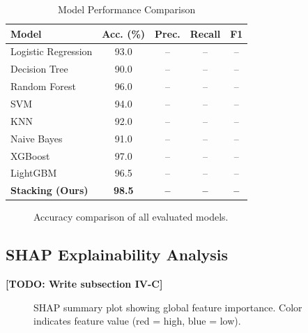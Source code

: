 \documentclass[conference]{IEEEtran}
\begin{document}
\begin{table}[htbp]
\caption{Model Performance Comparison}
\label{tab:model_comparison}
\centering
\renewcommand{\arraystretch}{1.2}
\begin{tabular}{|l|c|c|c|c|}
\hline
\textbf{Model} & \textbf{Acc. (\%)} & \textbf{Prec.} & \textbf{Recall} & \textbf{F1} \\
\hline
Logistic Regression  & 93.0 & -- & -- & -- \\
Decision Tree        & 90.0 & -- & -- & -- \\
Random Forest        & 96.0 & -- & -- & -- \\
SVM                  & 94.0 & -- & -- & -- \\
KNN                  & 92.0 & -- & -- & -- \\
Naive Bayes          & 91.0 & -- & -- & -- \\
XGBoost              & 97.0 & -- & -- & -- \\
LightGBM             & 96.5 & -- & -- & -- \\
\textbf{Stacking (Ours)} & \textbf{98.5} & \textbf{--} & \textbf{--} & \textbf{--} \\
\hline
\end{tabular}
\end{table}

\begin{figure}[htbp]
    \centering
    \caption{Accuracy comparison of all evaluated models.}
    \label{fig:model_comparison}
\end{figure}

\subsection{SHAP Explainability Analysis}
\textbf{[TODO: Write subsection IV-C]}

\begin{figure}[htbp]
    \centering
    \caption{SHAP summary plot showing global feature importance. Color indicates feature value (red = high, blue = low).}
    \label{fig:shap}
\end{figure}
\end{document}
